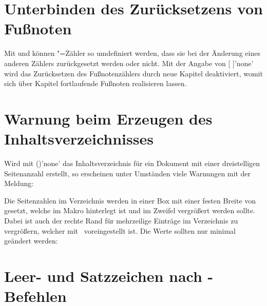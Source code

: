 \section{%
  Unterbinden des Zurücksetzens von Fußnoten%
}

Mit  und  können 
"=Zähler so umdefiniert werden, dass sie bei der Änderung eines 
anderen Zählers zurückgesetzt werden oder nicht. Mit der Angabe von 
[%
]'none' wird das Zurücksetzen des Fußnotenzählers durch neue Kapitel 
deaktiviert, womit sich über Kapitel fortlaufende Fußnoten 
realisieren lassen.



\section{%
  Warnung beim Erzeugen des Inhaltsverzeichnisses%
}

%
Wird mit ()'none' das 
Inhaltsverzeichnis für ein Dokument mit einer dreistelligen Seitenanzahl 
erstellt, so erscheinen unter Umständen viele Warnungen mit der Meldung:
%
\begin{quoting}
\end{quoting}
%
Die Seitenzahlen im Verzeichnis werden in einer Box mit einer festen Breite 
von~\PValue{1.55em} gesetzt, welche im Makro  hinterlegt ist 
und im Zweifel vergrößert werden sollte. Dabei ist auch der rechte Rand für 
%
mehrzeilige Einträge im Verzeichnis  zu vergrößern, welcher 
mit~\PValue{2.55em} voreingestellt ist. Die Werte sollten nur minimal geändert 
werden:
%
\begin{quoting}
\begin{Code}
\makeatletter
\renewcommand*{\@pnumwidth}{1.7em}\renewcommand*{\@tocrmarg}{2.7em}
\makeatother
\end{Code}
\end{quoting}



\section{%
  Leer- und Satzzeichen nach -Befehlen%
  \label{sec:tips:xspace}%
}

